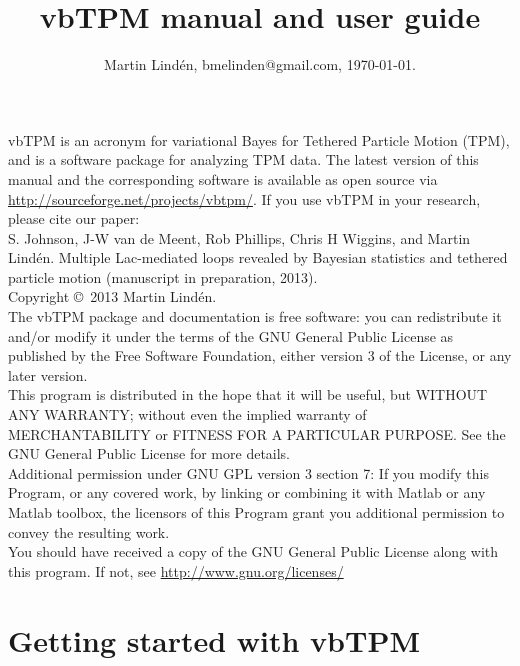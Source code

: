 \documentclass[11pt,letterpaper,twocolumn]{article}
\title{vbTPM manual and user guide}
\author{Martin Lind\'en, bmelinden@gmail.com, \today.}
\date{}
\begin{document}
\onecolumn
\maketitle 
\noindent 
vbTPM is an acronym for variational Bayes for Tethered Particle Motion
(TPM), and is a software package for analyzing TPM data.  The latest
version of this manual and the corresponding software is available as
open source via \url{http://sourceforge.net/projects/vbtpm/}. If you
use vbTPM in your research, please cite our
paper:\smallskip\\\noindent S. Johnson, J-W van de Meent, Rob
Phillips, Chris H Wiggins, and Martin Lindén. Multiple Lac-mediated
loops revealed by Bayesian statistics and tethered particle motion
(manuscript in preparation, 2013).\medskip\\

\noindent Copyright \copyright~2013 Martin Lindén. \medskip\\

\noindent
The vbTPM package and documentation is free software: you can
redistribute it and/or modify it under the terms of the GNU General
Public License as published by the Free Software Foundation, either
version 3 of the License, or any later version.\medskip\\

\noindent
This program is distributed in the hope that it will be useful, but
WITHOUT ANY WARRANTY; without even the implied warranty of
MERCHANTABILITY or FITNESS FOR A PARTICULAR PURPOSE. See the GNU
General Public License for more details.\medskip\\
 
\noindent
Additional permission under GNU GPL version 3 section 7: If you modify
this Program, or any covered work, by linking or combining it with
Matlab or any Matlab toolbox, the licensors of this Program grant you
additional permission to convey the resulting work.\medskip\\

\noindent 
You should have received a copy of the GNU General Public License
along with this program. If not, see \url{http://www.gnu.org/licenses/}


\twocolumn
\tableofcontents
\section{Getting started with vbTPM}

\end{document}
